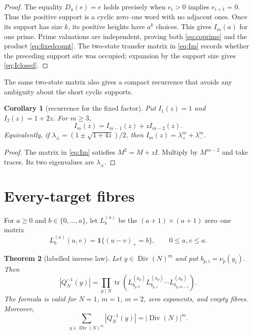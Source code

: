 \documentclass[a4paper,11pt]{amsart}
\newtheorem{theorem}{Theorem}[section]
\newtheorem{corollary}[theorem]{Corollary}
\theoremstyle{remark}
\newcommand{\Div}{\operatorname{Div}}
\newcommand{\tr}{\operatorname{tr}}
\begin{document}
\begin{proof}
The equality $D_a(e)=e$ holds precisely when $e_i>0$ implies
$e_{i+1}=0$.  Thus the positive support is a cyclic zero--one word with no
adjacent ones.  Once its support has size $k$, its positive heights have
$a^k$ choices.  This gives $I_m(a)$ for one prime.  Prime valuations are
independent, proving both \eqref{eq:coprime} and the product
\eqref{eq:fixedcount}.  The two-state transfer matrix in \eqref{eq:Im}
records whether the preceding support site was occupied; expansion by the
support size gives \eqref{eq:Iclosed}.
\end{proof}

The same two-state matrix also gives a compact recurrence that avoids any
ambiguity about the short cyclic supports.

\begin{corollary}[recurrence for the fixed factor]\label{cor:fixed-recurrence}
Put $I_1(z)=1$ and $I_2(z)=1+2z$.  For $m\geq3$,
\begin{equation}\label{eq:Irecurrence}
 I_m(z)=I_{m-1}(z)+zI_{m-2}(z).
\end{equation}
Equivalently, if
$\lambda_\pm=(1\pm\sqrt{1+4z})/2$, then
$I_m(z)=\lambda_+^m+\lambda_-^m$.
\end{corollary}

\begin{proof}
The matrix in \eqref{eq:Im} satisfies $M^2=M+zI$.  Multiply by $M^{m-2}$
and take traces.  Its two eigenvalues are $\lambda_\pm$.
\end{proof}

\section{Every-target fibres}

For $a\geq0$ and $b\in\{0,\ldots,a\}$, let $L_b^{(a)}$ be the
$(a+1)\times(a+1)$ zero--one matrix
\begin{equation}\label{eq:localmatrix}
 L_b^{(a)}(u,v)=\mathbf1\{(u-v)_+=b\},
 \qquad 0\leq u,v\leq a.
\end{equation}

\begin{theorem}[labelled inverse law]\label{thm:fibre}
Let $y\in\Div(N)^m$ and put $b_{p,i}=\nu_p(y_i)$.  Then
\begin{equation}\label{eq:fibre}
 |Q_N^{-1}(y)|=
 \prod_{p\mid N}\tr\left(
   L_{b_{p,0}}^{(a_p)}L_{b_{p,1}}^{(a_p)}\cdots
   L_{b_{p,m-1}}^{(a_p)}\right).
\end{equation}
The formula is valid for $N=1$, $m=1$, $m=2$, zero exponents, and empty
fibres.  Moreover,
\begin{equation}\label{eq:mass}
 \sum_{y\in\Div(N)^m}|Q_N^{-1}(y)|=|\Div(N)|^m.
\end{equation}
\end{theorem}
\end{document}
